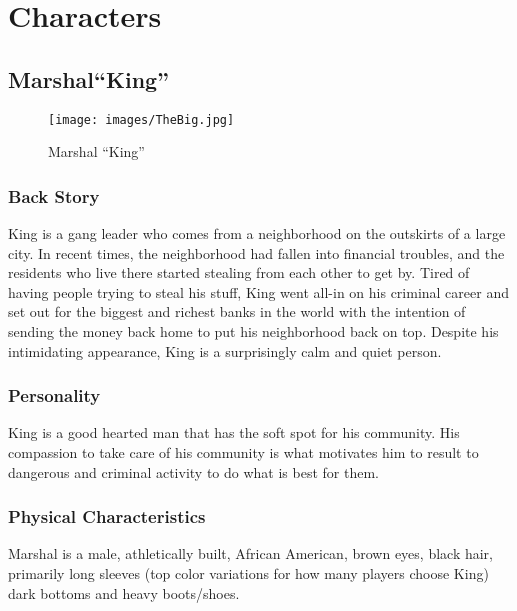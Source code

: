 \documentclass[10pt]{report}
\begin{document}
\chapter{Characters}

\section{Marshal``King''}

\begin{multicols}{2}
    \begin{figure}[H]
        \centering
        \texttt{[image: images/TheBig.jpg]}
        \caption{Marshal ``King''}
    \end{figure}
    
    \subsection{Back Story}

    King is a gang leader who comes from a neighborhood on the outskirts of a large city. In recent times, the neighborhood had fallen into financial troubles, and the residents who live there started stealing from each other to get by. Tired of having people trying to steal his stuff, King went all-in on his criminal career and set out for the biggest and richest banks in the world with the intention of sending the money back home to put his neighborhood back on top. Despite his intimidating appearance, King is a surprisingly calm and quiet person. 
    
    \subsection{Personality}
    
    King is a good hearted man that has the soft spot for his community. His compassion to take care of his community is what motivates him to result to dangerous and criminal activity to do what is best for them.
    
    \subsection{Physical Characteristics}
    
    Marshal is a male, athletically built, African American, brown eyes, black hair, primarily long sleeves (top color variations for how many players choose King) dark bottoms and heavy boots/shoes.
    

\end{multicols}
\end{document}
